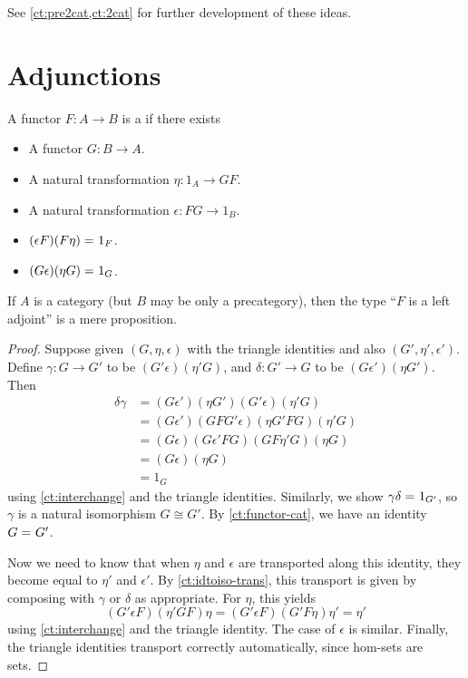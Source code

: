 See \autoref{ct:pre2cat,ct:2cat} for further development of these ideas.


\section{Adjunctions}
\label{sec:adjunctions}

\begin{defn}
  A functor $F:A\to B$ is a  if there exists
  \begin{itemize}
  \item A functor $G:B\to A$.
  \item A natural transformation $\eta:1_A \to GF$.
  \item A natural transformation $\epsilon:FG\to 1_B$.
  \item $(\epsilon F)(F\eta) =_{} 1_F$.
  \item $(G\epsilon)(\eta G) =_{} 1_G$.
  \end{itemize}
\end{defn}

\begin{lem}\label{ct:adjprop}
  If $A$ is a category (but $B$ may be only a precategory), then the type ``$F$ is a left adjoint'' is a mere proposition.
\end{lem}
\begin{proof}
  Suppose given $(G,\eta,\epsilon)$ with the triangle identities and also $(G',\eta',\epsilon')$.
  Define $\gamma:G\to G'$ to be $(G'\epsilon)(\eta' G)$, and $\delta:G'\to G$ to be $(G\epsilon')(\eta G')$.
  Then
  \begin{align*}
    \delta\gamma &=
    (G\epsilon')(\eta G')(G'\epsilon)(\eta'G)\\
    &= (G\epsilon')(G F G'\epsilon)(\eta G' F G)(\eta'G)\\
    &= (G\epsilon)(G\epsilon'FG)(G F \eta' G)(\eta G)\\
    &= (G\epsilon)(\eta G)\\
    &= 1_G
  \end{align*}
  using \autoref{ct:interchange} and the triangle identities.
  Similarly, we show $\gamma\delta =_{} 1_{G'}$, so $\gamma$ is a natural isomorphism $G\cong G'$.
  By \autoref{ct:functor-cat}, we have an identity $G =_{} G'$.

  Now we need to know that when $\eta$ and $\epsilon$ are transported along this identity, they become equal to $\eta'$ and $\epsilon'$.
  By \autoref{ct:idtoiso-trans}, this transport is given by composing with $\gamma$ or $\delta$ as appropriate.
  For $\eta$, this yields
  \begin{equation*}
    (G'\epsilon F)(\eta'GF)\eta
    = (G'\epsilon F)(G'F\eta)\eta'
    = \eta'
  \end{equation*}
  using \autoref{ct:interchange} and the triangle identity.
  The case of $\epsilon$ is similar.
  Finally, the triangle identities transport correctly automatically, since hom-sets are sets.
\end{proof}

